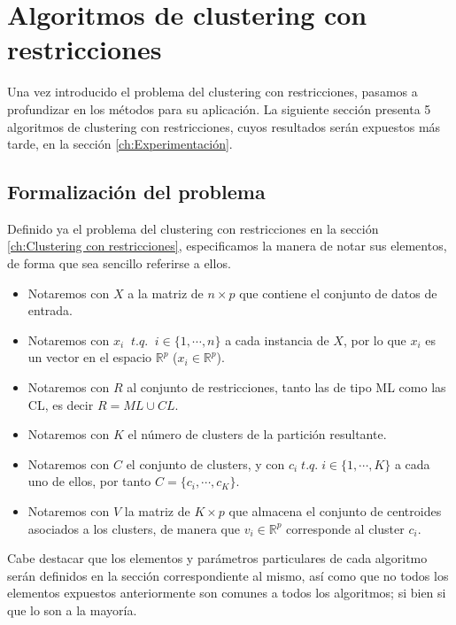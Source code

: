 \chapter{Algoritmos de clustering con restricciones}\label{ch:Algoritmos}

Una vez introducido el problema del clustering con restricciones, pasamos a profundizar en los métodos para su aplicación. La siguiente sección presenta 5 algoritmos de clustering con restricciones, cuyos resultados serán expuestos más tarde, en la sección \ref{ch:Experimentación}.

\section{Formalización del problema}

Definido ya el problema del clustering con restricciones en la sección \ref{ch:Clustering con restricciones}, especificamos la manera de notar sus elementos, de forma que sea sencillo referirse a ellos.

\begin{itemize}
	
	\item Notaremos con $X$ a la matriz de $n\times p$ que contiene el conjunto de datos de entrada.
	
	\item Notaremos con $x_i \;\; t.q. \;\; i \in \{1, \cdots, n\}$ a cada instancia de $X$, por lo que $x_i$ es un vector en el espacio $\mathbb{R}^p$ ($x_i \in \mathbb{R}^p$).
	
	\item Notaremos con $R$ al conjunto de restricciones, tanto las de tipo \acs{ML} como las \acs{CL}, es decir $R = ML \cup CL$. 
	
	\item Notaremos con $K$ el número de clusters de la partición resultante.
	
	\item Notaremos con $C$ el conjunto de clusters, y con $c_i \; t.q. \; i \in \{1, \cdots, K\}$ a cada uno de ellos, por tanto $C = \{c_i, \cdots, c_K\}$.
	
	\item Notaremos con $V$ la matriz de $K\times p$ que almacena el conjunto de centroides asociados a los clusters, de manera que $v_i \in \mathbb{R}^p$ corresponde al cluster $c_i$.
	
\end{itemize}
Cabe destacar que los elementos y parámetros particulares de cada algoritmo serán definidos en la sección correspondiente al mismo, así como que no todos los elementos expuestos anteriormente son comunes a todos los algoritmos; si bien si que lo son a la mayoría.

